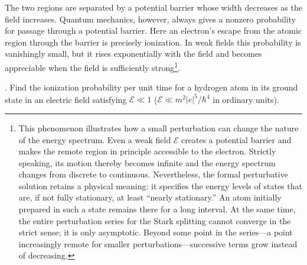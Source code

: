 The two regions are separated by a potential barrier whose width decreases as the field increases. Quantum mechanics, however, always gives a nonzero probability for passage through a potential barrier. Here an electron's escape from the atomic region through the barrier is precisely ionization. In weak fields this probability is vanishingly small, but it rises exponentially with the field and becomes appreciable when the field is sufficiently strong\footnote{This phenomenon illustrates how a small perturbation can change the nature of the energy spectrum. Even a weak field $\mathcal E$ creates a potential barrier and makes the remote region in principle accessible to the electron. Strictly speaking, its motion thereby becomes infinite and the energy spectrum changes from discrete to continuous. Nevertheless, the formal perturbative solution retains a physical meaning: it specifies the energy levels of states that are, if not fully stationary, at least ``nearly stationary.'' An atom initially prepared in such a state remains there for a long interval. At the same time, the entire perturbation series for the Stark splitting cannot converge in the strict sense; it is only asymptotic. Beyond some point in the series---a point increasingly remote for smaller perturbations---successive terms grow instead of decreasing.}.

. Find the ionization probability per unit time for a hydrogen atom in its ground state in an electric field satisfying $\mathcal E\ll1$ ($\mathcal E\ll m^2|e|^5/\hbar^4$ in ordinary units).

